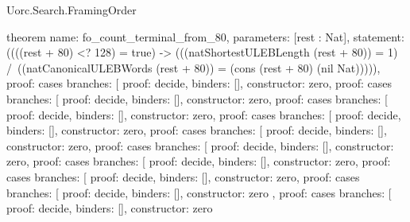 \begin{lexlean}{Uorc.Search.FramingOrder}
\begin{semanticmodule}
theorem{
  name: fo_count_terminal_from_80,
  parameters: [rest : Nat],
  statement: ((((rest + 80) <? 128) = true) -> (((natShortestULEBLength (rest + 80)) = 1) /\ ((natCanonicalULEBWords (rest + 80)) = (cons (rest + 80) (nil Nat))))),
  proof: cases{
    branches: [
      {proof: decide{}, binders: [], constructor: zero},
      {
        proof: cases{
          branches: [
            {proof: decide{}, binders: [], constructor: zero},
            {
              proof: cases{
                branches: [
                  {proof: decide{}, binders: [], constructor: zero},
                  {
                    proof: cases{
                      branches: [
                        {proof: decide{}, binders: [], constructor: zero},
                        {
                          proof: cases{
                            branches: [
                              {proof: decide{}, binders: [], constructor: zero},
                              {
                                proof: cases{
                                  branches: [
                                    {proof: decide{}, binders: [], constructor: zero},
                                    {
                                      proof: cases{
                                        branches: [
                                          {proof: decide{}, binders: [], constructor: zero},
                                          {
                                            proof: cases{
                                              branches: [
                                                {proof: decide{}, binders: [], constructor: zero},
                                                {
                                                  proof: cases{
                                                    branches: [
                                                      {
                                                        proof: decide{},
                                                        binders: [],
                                                        constructor: zero
                                                      },
                                                      {
                                                        proof: cases{
                                                          branches: [
                                                            {
                                                              proof: decide{},
                                                              binders: [],
                                                              constructor: zero
}}}}}}}}}}}}}}}}}}}}}
\end{semanticmodule}
\end{lexlean}
